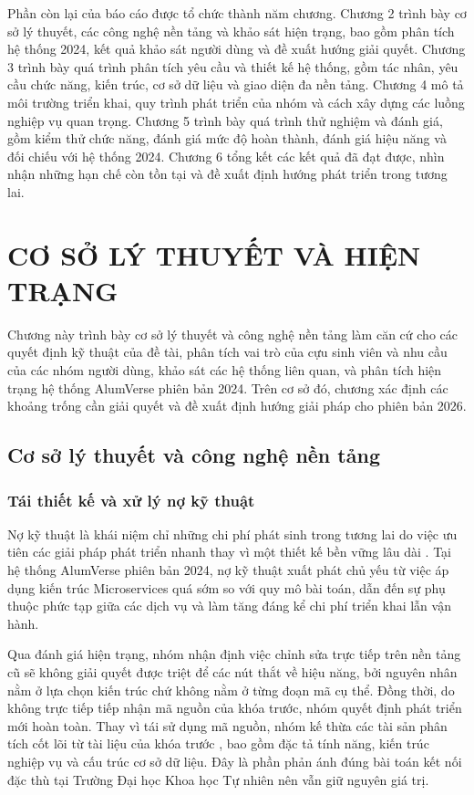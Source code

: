 \documentclass[12pt,a4paper,oneside]{report}
\begin{document}
Phần còn lại của báo cáo được tổ chức thành năm chương. Chương 2 trình bày cơ sở lý thuyết, các công nghệ nền tảng và khảo sát hiện trạng, bao gồm phân tích hệ thống 2024, kết quả khảo sát người dùng và đề xuất hướng giải quyết. Chương 3 trình bày quá trình phân tích yêu cầu và thiết kế hệ thống, gồm tác nhân, yêu cầu chức năng, kiến trúc, cơ sở dữ liệu và giao diện đa nền tảng. Chương 4 mô tả môi trường triển khai, quy trình phát triển của nhóm và cách xây dựng các luồng nghiệp vụ quan trọng. Chương 5 trình bày quá trình thử nghiệm và đánh giá, gồm kiểm thử chức năng, đánh giá mức độ hoàn thành, đánh giá hiệu năng và đối chiếu với hệ thống 2024. Chương 6 tổng kết các kết quả đã đạt được, nhìn nhận những hạn chế còn tồn tại và đề xuất định hướng phát triển trong tương lai.

\chapter{CƠ SỞ LÝ THUYẾT VÀ HIỆN TRẠNG}

Chương này trình bày cơ sở lý thuyết và công nghệ nền tảng làm căn cứ cho các quyết định kỹ thuật của đề tài, phân tích vai trò của cựu sinh viên và nhu cầu của các nhóm người dùng, khảo sát các hệ thống liên quan, và phân tích hiện trạng hệ thống AlumVerse phiên bản 2024. Trên cơ sở đó, chương xác định các khoảng trống cần giải quyết và đề xuất định hướng giải pháp cho phiên bản 2026.

\section{Cơ sở lý thuyết và công nghệ nền tảng}

\subsection{Tái thiết kế và xử lý nợ kỹ thuật}

Nợ kỹ thuật là khái niệm chỉ những chi phí phát sinh trong tương lai do việc ưu tiên các giải pháp phát triển nhanh thay vì một thiết kế bền vững lâu dài \cite{cunningham,fowlerref}. Tại hệ thống AlumVerse phiên bản 2024, nợ kỹ thuật xuất phát chủ yếu từ việc áp dụng kiến trúc Microservices quá sớm so với quy mô bài toán, dẫn đến sự phụ thuộc phức tạp giữa các dịch vụ và làm tăng đáng kể chi phí triển khai lẫn vận hành.

Qua đánh giá hiện trạng, nhóm nhận định việc chỉnh sửa trực tiếp trên nền tảng cũ sẽ không giải quyết được triệt để các nút thắt về hiệu năng, bởi nguyên nhân nằm ở lựa chọn kiến trúc chứ không nằm ở từng đoạn mã cụ thể. Đồng thời, do không trực tiếp tiếp nhận mã nguồn của khóa trước, nhóm quyết định phát triển mới hoàn toàn. Thay vì tái sử dụng mã nguồn, nhóm kế thừa các tài sản phân tích cốt lõi từ tài liệu của khóa trước \cite{alumverse}, bao gồm đặc tả tính năng, kiến trúc nghiệp vụ và cấu trúc cơ sở dữ liệu. Đây là phần phản ánh đúng bài toán kết nối đặc thù tại Trường Đại học Khoa học Tự nhiên nên vẫn giữ nguyên giá trị.
\end{document}
